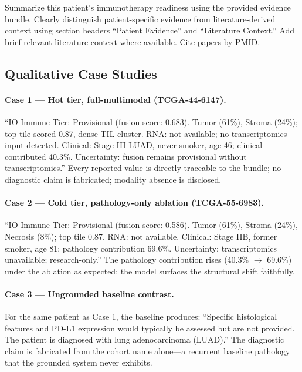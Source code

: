 \documentclass[11pt]{article}
\begin{document}
\begin{tcolorbox}[
    colback=gray!10,
    colframe=gray!50,
    sharp corners,
    boxrule=0.5pt,
    left=5pt,
    right=5pt,
    top=5pt,
    bottom=5pt,
    width=\linewidth,
    boxsep=2pt
]
Summarize this patient's immunotherapy readiness using the provided evidence bundle. Clearly distinguish patient-specific evidence from literature-derived context using section headers ``Patient Evidence'' and ``Literature Context.'' Add brief relevant literature context where available. Cite papers by PMID.
\end{tcolorbox}

\subsection{Qualitative Case Studies}

\paragraph{Case 1 — Hot tier, full-multimodal (TCGA-44-6147).}
``IO Immune Tier: Provisional (fusion score: 0.683). Tumor (61\%), Stroma (24\%); top tile scored 0.87, dense TIL cluster. RNA: not available; no transcriptomics input detected. Clinical: Stage III LUAD, never smoker, age 46; clinical contributed 40.3\%. Uncertainty: fusion remains provisional without transcriptomics.'' Every reported value is directly traceable to the bundle; no diagnostic claim is fabricated; modality absence is disclosed.

\paragraph{Case 2 — Cold tier, pathology-only ablation (TCGA-55-6983).}
``IO Immune Tier: Provisional (fusion score: 0.586). Tumor (61\%), Stroma (24\%), Necrosis (8\%); top tile 0.87. RNA: not available. Clinical: Stage IIB, former smoker, age 81; pathology contribution 69.6\%. Uncertainty: transcriptomics unavailable; research-only.'' The pathology contribution rises (40.3\% $\rightarrow$ 69.6\%) under the ablation as expected; the model surfaces the structural shift faithfully.

\paragraph{Case 3 — Ungrounded baseline contrast.}
For the same patient as Case 1, the baseline produces: ``Specific histological features and PD-L1 expression would typically be assessed but are not provided. The patient is diagnosed with lung adenocarcinoma (LUAD).'' The diagnostic claim is fabricated from the cohort name alone—a recurrent baseline pathology that the grounded system never exhibits.
\end{document}
